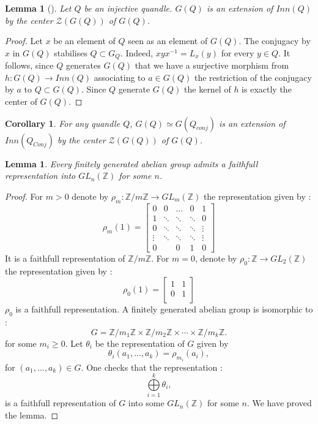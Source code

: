 \documentclass[12pt, reqno]{amsart}
\newtheorem{corollary}[theorem]{Corollary}
\newtheorem{lemma}[theorem]{Lemma}
\newcommand{\Z}{ {\mathbb Z} }
\begin{document}
\begin{lemma}[\cite{dar}]\label{lem1}
Let $Q$ be an injective quandle. $G(Q)$ is an extension of $Inn(Q)$ by the center $\mathcal{Z}(G(Q))$ of $G(Q)$.
\end{lemma}
\begin{proof}
Let $x$ be an element of $Q$ seen as an element of $G(Q)$. The conjugacy by $x$ in $G(Q)$ stabilises $Q \subset G_Q$. Indeed, $xyx^{-1}=L_x(y)$ for every $y\in Q$. It follows, since $Q$ generates $G(Q)$ that we have a surjective morphism from $h: G(Q)\to Inn(Q)$ associating to $a\in G(Q)$ the restriction of the conjugacy by $a$ to $Q\subset G(Q)$. Since $Q$ generate $G(Q)$ the kernel of $h$ is exactly the center of $G(Q)$.  
\end{proof}
\begin{corollary}\label{cen}
For any quandle $Q$, $G(Q)\simeq G(Q_{conj})$ is an extension of $Inn(Q_{Conj})$ by the center $\mathcal{Z}(G(Q))$ of $G(Q)$.
\end{corollary}
\begin{lemma}\label{lem2}
Every finitely generated abelian group admits a faithfull representation into $GL_n(\Z)$ for some $n$.
\end{lemma}
\begin{proof}
For $m>0$ denote by $\rho_m: \Z/m\Z \to GL_m(\Z)$ the representation given by :
$$ \rho_m(1)=   \begin{bmatrix}
  0& 0 	& \dots &0&1\\
1&\ddots &\ddots &\ddots&0  \\
0&\ddots & \ddots & \ddots& \vdots \\
\vdots& \ddots & \ddots & \ddots &\vdots\\
0& &0 &1 &  0\end{bmatrix}
$$
It is a faithfull representation of $\Z/m\Z$. For $m=0$, denote by $\rho_0 : \Z \to GL_2(\Z)$ the representation given by :
$$\rho_0(1)= \begin{bmatrix}
  1& 1\\
0&1 \\
\end{bmatrix} $$
$\rho_0$ is a faithfull representation. A finitely generated abelian group is isomorphic to :
 $$G=\Z/{m_1}\Z\times \Z/m_2\Z \times \cdots \times \Z/m_k \Z.$$
for some $m_i\geq 0$. Let $\theta_i$ be the representation of $G$ given by $$\theta_i(a_1,\dots , a_k)=\rho_{m_i}(a_i),$$ for $(a_1,\dots,a_k)\in G$. One checks that the representation : $$\overset{k}{\underset{i=1}{\bigoplus}} \theta_i,$$
is a faithfull representation of $G$ into some $GL_n(\Z)$ for some $n$. We have proved the lemma.
\end{proof}
\end{document}

